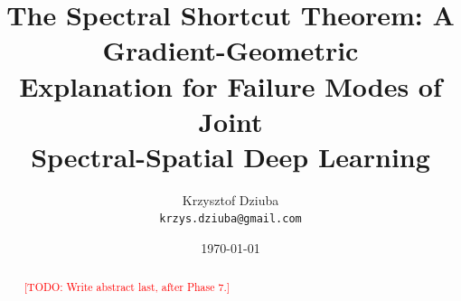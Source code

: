 \documentclass[11pt,a4paper]{article}
\title{The Spectral Shortcut Theorem: A Gradient-Geometric \\
       Explanation for Failure Modes of Joint \\
       Spectral-Spatial Deep Learning}
\author{Krzysztof Dziuba \\ \texttt{krzys.dziuba@gmail.com}}
\date{\today}
\theoremstyle{definition}
\theoremstyle{remark}
\newcommand{\TODO}[1]{\textcolor{red}{[TODO: #1]}}
\begin{document}
\maketitle

\begin{abstract}
\TODO{Write abstract last, after Phase 7.}
\end{abstract}














\appendix

\end{document}
